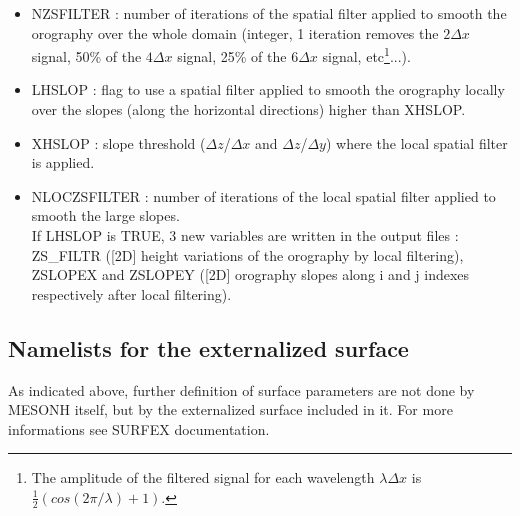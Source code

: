 \begin{itemize}
\item NZSFILTER : number of iterations of the spatial filter applied to smooth the orography over the whole domain (integer, 1 iteration removes the $2\Delta x$ signal, 50\% of the $4\Delta x$
signal, 25\% of the $6\Delta x$ signal, etc\footnote{The amplitude of the
filtered signal for each wavelength $\lambda\Delta x$ 
is $\frac{1}{2}\left( cos(2\pi/\lambda) +1\right)$.}...).
\item LHSLOP : flag to use a spatial filter applied to smooth the orography locally over the slopes (along the horizontal directions) higher than XHSLOP.
\item XHSLOP : slope threshold ($\Delta z$/$\Delta x$ and $\Delta z$/$\Delta y$) where the local spatial filter is applied.
\item NLOCZSFILTER : number of iterations of the local spatial filter applied to smooth the large slopes.
\\
If LHSLOP is TRUE, 3 new variables are written in the output files : ZS\_FILTR ([2D] height variations of the orography by local filtering), ZSLOPEX and ZSLOPEY ([2D] orography slopes along i and j indexes respectively after local filtering).
\end{itemize}
\subsection{Namelists for the externalized surface}

As indicated above, further definition of surface parameters are not done by MESONH itself, but by the externalized surface included in it. For more informations see SURFEX documentation.\\

